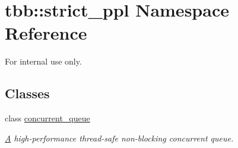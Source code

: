 \hypertarget{namespacetbb_1_1strict__ppl}{}\section{tbb\+:\+:strict\+\_\+ppl Namespace Reference}
\label{namespacetbb_1_1strict__ppl}


For internal use only.  


\subsection*{Classes}
\begin{DoxyCompactItemize}
\item 
class \hyperlink{classtbb_1_1strict__ppl_1_1concurrent__queue}{concurrent\+\_\+queue}
\begin{DoxyCompactList}\small\item\em \hyperlink{structA}{A} high-\/performance thread-\/safe non-\/blocking concurrent queue. \end{DoxyCompactList}\end{DoxyCompactItemize}
